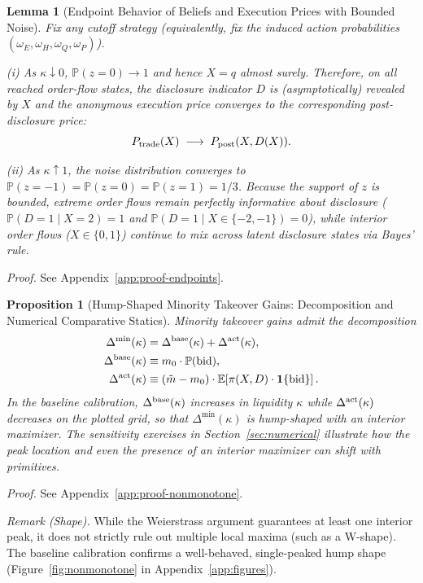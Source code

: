 \documentclass[11pt]{article}
\newtheorem{proposition}{Proposition}
\newtheorem{lemma}{Lemma}
\newcommand{\E}{\mathbb{E}}
\newcommand{\PP}{\mathbb{P}}
\newcommand{\1}{\mathbf{1}}
\begin{document}
\begin{lemma}[Endpoint Behavior of Beliefs and Execution Prices with Bounded Noise]
\label{lem:endpoints}
Fix any cutoff strategy (equivalently, fix the induced action probabilities $(\omega_E,\omega_H,\omega_Q,\omega_P)$).

\textup{(i)} As $\kappa\downarrow 0$, $\PP(z=0)\to 1$ and hence $X=q$ almost surely. Therefore, on all reached order-flow states, the disclosure indicator $D$ is (asymptotically) revealed by $X$ and the anonymous execution price converges to the corresponding post-disclosure price:
\[
P_{\textup{trade}}(X)\;\longrightarrow\;P_{\textup{post}}(X,D(X)).
\]

\textup{(ii)} As $\kappa\uparrow 1$, the noise distribution converges to $\PP(z=-1)=\PP(z=0)=\PP(z=1)=1/3$. Because the support of $z$ is bounded, extreme order flows remain perfectly informative about disclosure ($\PP(D=1\mid X=2)=1$ and $\PP(D=1\mid X\in\{-2,-1\})=0$), while interior order flows ($X\in\{0,1\}$) continue to mix across latent disclosure states via Bayes' rule.
\end{lemma}
\textit{Proof.} See Appendix~\ref{app:proof-endpoints}.

\begin{proposition}[Hump-Shaped Minority Takeover Gains: Decomposition and Numerical Comparative Statics]
\label{prop:nonmonotone}
Minority takeover gains admit the decomposition
\begin{align*}
\Delta^{\min}(\kappa)
&=
\Delta^{\textup{base}}(\kappa)
+
\Delta^{\textup{act}}(\kappa),\\
\Delta^{\textup{base}}(\kappa)
&\equiv m_0\cdot \PP(\textup{bid}),\\
\Delta^{\textup{act}}(\kappa)
&\equiv (\tilde m-m_0)\cdot \E\!\left[\pi(X,D)\cdot \1\{\textup{bid}\}\right].
\end{align*}
In the baseline calibration, $\Delta^{\textup{base}}(\kappa)$ increases in liquidity $\kappa$ while $\Delta^{\textup{act}}(\kappa)$ decreases on the plotted grid, so that $\Delta^{\min}(\kappa)$ is hump-shaped with an interior maximizer. The sensitivity exercises in Section~\ref{sec:numerical} illustrate how the peak location and even the presence of an interior maximizer can shift with primitives.
\end{proposition}
\textit{Proof.} See Appendix~\ref{app:proof-nonmonotone}.

\emph{Remark (Shape).} While the Weierstrass argument guarantees at least one interior peak, it does not strictly rule out multiple local maxima (such as a W-shape). The baseline calibration confirms a well-behaved, single-peaked hump shape (Figure~\ref{fig:nonmonotone} in Appendix~\ref{app:figures}).
\end{document}
